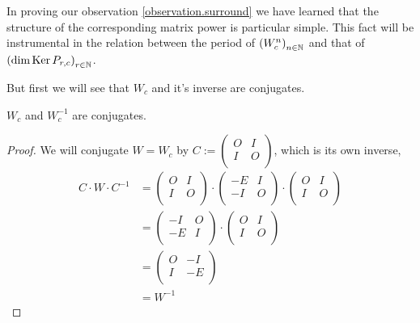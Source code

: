 In proving our observation \ref{observation.surround} we have learned that the
structure of the corresponding matrix power is particular simple. This fact will
be instrumental in the relation between the period of
$\left(W_{c}^{n}\right)_{n\in\mathbb{N}}$ and that of
$\left(\dim\operatorname{Ker} P_{r,c}\right)_{r\in\mathbb{N}}$.

But first we will see that $W_{c}$ and it's inverse are conjugates.

\begin{lemma}
  $W_{c}$ and $W_{c}^{-1}$ are conjugates.
\end{lemma}

\begin{proof}
  We will conjugate $W=W_{c}$ by
  $C := \left(\begin{smallmatrix} O & I \\ I & O \\\end{smallmatrix}\right)$,
  which is its own inverse,
  \[
  \begin{aligned}
  C \cdot W \cdot C^{-1}
  & =
  \left(
  \begin{array}{cc}
    O & I \\
    I & O \\
  \end{array}
  \right)
  \cdot
  \left(
  \begin{array}{cc}
    -E & I \\
    -I & O \\
  \end{array}
  \right)
  \cdot
  \left(
  \begin{array}{cc}
    O & I \\
    I & O \\
  \end{array}
  \right) \\
  & =
  \left(
  \begin{array}{cc}
    -I & O \\
    -E & I \\
  \end{array}
  \right)
  \cdot
  \left(
  \begin{array}{cc}
    O & I \\
    I & O \\
  \end{array}
  \right) \\
  & =
  \left(
  \begin{array}{cc}
    O & -I \\
    I & -E \\
  \end{array}
  \right) \\
  & =
  W^{-1}
  \end{aligned}
  \]
\end{proof}

